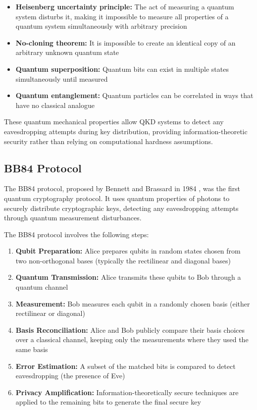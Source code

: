 \documentclass[onecolumn,a4paper,10pt]{IEEEtran}
\begin{document}
\begin{itemize}
    \item \textbf{Heisenberg uncertainty principle:} The act of measuring a quantum system disturbs it, making it impossible to measure all properties of a quantum system simultaneously with arbitrary precision
    \item \textbf{No-cloning theorem:} It is impossible to create an identical copy of an arbitrary unknown quantum state
    \item \textbf{Quantum superposition:} Quantum bits can exist in multiple states simultaneously until measured
    \item \textbf{Quantum entanglement:} Quantum particles can be correlated in ways that have no classical analogue
\end{itemize}

These quantum mechanical properties allow QKD systems to detect any eavesdropping attempts during key distribution, providing information-theoretic security rather than relying on computational hardness assumptions.

\subsection{BB84 Protocol}

\begin{technote}
The BB84 protocol, proposed by Bennett and Brassard in 1984 \cite{bb84}, was the first quantum cryptography protocol. It uses quantum properties of photons to securely distribute cryptographic keys, detecting any eavesdropping attempts through quantum measurement disturbances.
\end{technote}

The BB84 protocol involves the following steps:

\begin{enumerate}
    \item \textbf{Qubit Preparation:} Alice prepares qubits in random states chosen from two non-orthogonal bases (typically the rectilinear and diagonal bases)
    \item \textbf{Quantum Transmission:} Alice transmits these qubits to Bob through a quantum channel
    \item \textbf{Measurement:} Bob measures each qubit in a randomly chosen basis (either rectilinear or diagonal)
    \item \textbf{Basis Reconciliation:} Alice and Bob publicly compare their basis choices over a classical channel, keeping only the measurements where they used the same basis
    \item \textbf{Error Estimation:} A subset of the matched bits is compared to detect eavesdropping (the presence of Eve)
    \item \textbf{Privacy Amplification:} Information-theoretically secure techniques are applied to the remaining bits to generate the final secure key
\end{enumerate}
\end{document}
